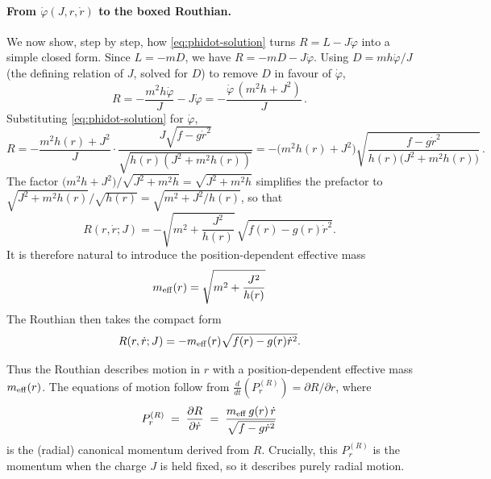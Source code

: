 \documentclass[11pt]{article}
\begin{document}
\paragraph{From $\dot\varphi(J,r,\dot r)$ to the boxed Routhian.} We now show, step by step, how \eqref{eq:phidot-solution} turns $R=L-J\dot\varphi$ into a simple closed form. Since $L=-mD$, we have $R=-mD-J\dot\varphi$. Using $D=mh\dot\varphi/J$ (the defining relation of $J$, solved for $D$) to remove $D$ in favour of $\dot\varphi$,
\begin{equation}
R = -\frac{m^2h\dot\varphi}{J}-J\dot\varphi = -\frac{\dot\varphi\,(m^2h+J^2)}{J}\,.
\end{equation}
Substituting \eqref{eq:phidot-solution} for $\dot\varphi$,
\begin{equation}
R = -\frac{m^2h(r)+J^2}{J}\cdot\frac{J\sqrt{f-g\dot r^2}}{\sqrt{h(r)(J^2+m^2h(r))}}
= -\big(m^2h(r)+J^2\big)\sqrt{\frac{f-g\dot r^2}{h(r)\big(J^2+m^2h(r)\big)}}\,.
\end{equation}
The factor $\big(m^2h+J^2\big)/\sqrt{J^2+m^2h}=\sqrt{J^2+m^2h}$ simplifies the prefactor to $\sqrt{J^2+m^2h(r)}/\sqrt{h(r)}=\sqrt{m^2+J^2/h(r)}$, so that
\begin{equation}
R(r,\dot r;J)
=
-
\sqrt{m^2+\frac{J^2}{h(r)}}
\,
\sqrt{f(r)-g(r)\dot r^2}.
\end{equation}
It is therefore natural to introduce the position-dependent effective mass
\begin{equation}
m_{\rm eff}(r)
=
\sqrt{m^2+\frac{J^2}{h(r)}}
\end{equation}
The Routhian then takes the compact form
\begin{equation}
R(r,\dot r;J)
=
-
m_{\rm eff}(r)
\sqrt{f(r)-g(r)\dot r^2}.
\end{equation}

Thus the Routhian describes motion in $r$ with a position-dependent effective mass $m_{\rm eff}(r)$.  The equations of motion follow from $\frac{d}{dt}(P_r^{(R)})=\partial R/\partial r$, where
\begin{equation*}
P_r^{(R)} \;=\; \frac{\partial R}{\partial \dot r}
\;=\;
\frac{m_{\rm eff}\,g(r)\,\dot r}{\sqrt{f - g\dot r^2}}
\end{equation*}
is the (radial) canonical momentum derived from $R$.  Crucially, this $P_r^{(R)}$ is the momentum when the charge $J$ is held fixed, so it describes purely radial motion.
\end{document}
